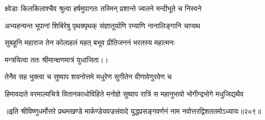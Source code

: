 \twolineshloka
{क्ष्वेडाः किलकिलाश्चैव श्रुत्वा हर्षमुपागतः}
{तस्मिन् प्रशान्ते ज्वलने मन्दीभूते च निस्वने}%

\twolineshloka
{अभ्यहन्यन्त भूपानां शिबिरेषु पृथक्पृथक्}
{संज्ञातूर्याणि रम्याणि नानालिङ्गानि चाप्यथ}%

\twolineshloka
{सुबहूनि महाराज तेन कोलाहलं महत्}
{बभूव प्रीतिजननं भरतस्य महात्मनः}%

मन्त्रयित्वा ततः श्रीमान्क्षणमात्रं युधाजिता।।

\twolineshloka
{तेनैव सह भुक्त्वा च सुष्वाप शयनोत्तमे}
{मधुरेण सुगीतेन वीणावेणुरवेण च}%

\twolineshloka
{हिमावदाते वरमाल्यचित्रे वितानकाधोविहिते मनोज्ञे}
{सुष्वाप रात्रिं स महानुभावो भोगीन्द्रभोगे मधुजिद्यथैव}%

॥इति श्रीविष्णुधर्मोत्तरे प्रथमखण्डे मार्कण्डेयवज्रसंवादे युद्धप्रसङ्गवर्णनं नाम नवोत्तरद्विशततमोऽध्यायः॥२०९॥
